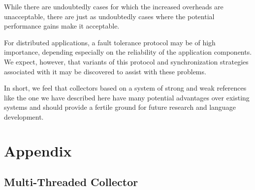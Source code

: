 While there are undoubtedly cases for which the increased overheads are unacceptable,
there are just as undoubtedly cases where the potential performance gains make it acceptable.

For distributed applications, a fault tolerance protocol may be of high importance, depending
especially on the reliability of the application components. We expect, however, that variants
of this protocol and synchronization strategies associated with it may be discovered to assist
with these problems.

In short, we feel that collectors based on a system of strong and weak references like
the one we have described here have many potential advantages over existing systems and
should provide a fertile ground for future research and language development.

\section{Appendix}
\subsection{Multi-Threaded Collector}
\label{singlethread}

\clearpage

